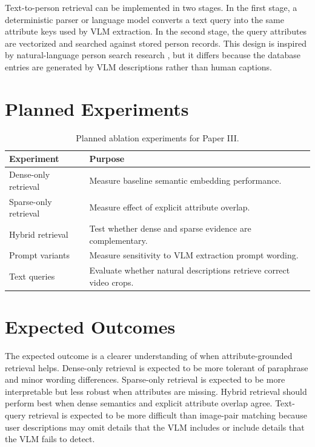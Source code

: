 Text-to-person retrieval can be implemented in two stages. In the first stage, a deterministic parser or language model converts a text query into the same attribute keys used by VLM extraction. In the second stage, the query attributes are vectorized and searched against stored person records. This design is inspired by natural-language person search research \citep{li2017personsearch}, but it differs because the database entries are generated by VLM descriptions rather than human captions.

\section{Planned Experiments}

\begin{table}[htbp]
  \centering
  \caption{Planned ablation experiments for Paper III.}
  \label{tab:paper3-planned-experiments}
  \begin{tabularx}{\textwidth}{lX}
    \toprule
    Experiment & Purpose \\
    \midrule
    Dense-only retrieval & Measure baseline semantic embedding performance. \\
    Sparse-only retrieval & Measure effect of explicit attribute overlap. \\
    Hybrid retrieval & Test whether dense and sparse evidence are complementary. \\
    Prompt variants & Measure sensitivity to VLM extraction prompt wording. \\
    Text queries & Evaluate whether natural descriptions retrieve correct video crops. \\
    \bottomrule
  \end{tabularx}
\end{table}

\section{Expected Outcomes}

The expected outcome is a clearer understanding of when attribute-grounded retrieval helps. Dense-only retrieval is expected to be more tolerant of paraphrase and minor wording differences. Sparse-only retrieval is expected to be more interpretable but less robust when attributes are missing. Hybrid retrieval should perform best when dense semantics and explicit attribute overlap agree. Text-query retrieval is expected to be more difficult than image-pair matching because user descriptions may omit details that the VLM includes or include details that the VLM fails to detect.

